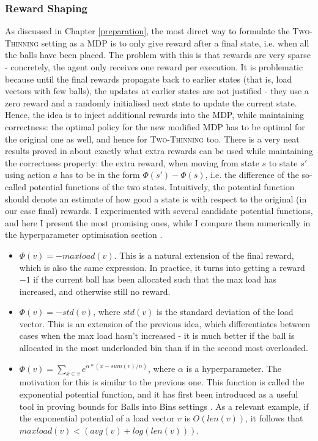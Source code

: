 \subsubsection{Reward Shaping}


As discussed in Chapter \ref{preparation}, the most direct way to formulate the \textsc{Two-Thinning} setting as a MDP is to only give reward after a final state, i.e. when all the balls have been placed. The problem with this is that rewards are very sparse - concretely, the agent only receives one reward per execution. It is problematic because until the final rewards propagate back to earlier states (that is, load vectors with few balls), the updates at earlier states are not justified - they use a zero reward and a randomly initialised next state to update the current state. Hence, the idea is to inject additional rewards into the MDP, while maintaining correctness: the optimal policy for the new modified MDP has to be optimal for the original one as well, and hence for \textsc{Two-Thinning} too. There is a very neat results proved in \cite{ng1999rewardshaping} about exactly what extra rewards can be used while maintaining the correctness property: the extra reward, when moving from state $s$ to state $s'$ using action $a$ has to be in the form $\Phi(s')-\Phi(s)$, i.e. the difference of the so-called potential functions of the two states. Intuitively, the potential function should denote an estimate of how good a state is with respect to the original (in our case final) rewards. I experimented with several candidate potential functions, and here I present the most promising ones, while I compare them numerically in the hyperparameter optimisation section .


\begin{itemize}
    \item
    $\Phi(v)=-maxload(v)$. This is a natural extension of the final reward, which is also the same expression. In practice, it turns into getting a reward $-1$ if the current ball has been allocated such that the max load has increased, and otherwise still no reward.
    \item
    $\Phi(v)=-std(v)$, where $std(v)$ is the standard deviation of the load vector. This is an extension of the previous idea, which differentiates between cases when the max load hasn't increased - it is much better if the ball is allocated in the most underloaded bin than if in the second most overloaded.
    \item
    $\Phi(v)=\sum_{x\in v} e^{\alpha * (x - sum(v) / n)}$, where $\alpha$ is a hyperparameter. The motivation for this is similar to the previous one. This function is called the exponential potential function, and it has first been introduced as a useful tool in proving bounds for Balls into Bins settings \cite{ghosh1999exponentialpotential} . As a relevant example, if the exponential potential of a load vector $v$ is $O(len(v))$, it follows that $maxload(v) < (avg(v)+log(len(v)))$.
\end{itemize}


